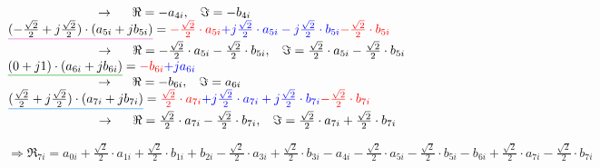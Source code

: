 $\hspace{2.5cm}\rightarrow \hspace{0.5cm} \Re=-a_{4i}, \hspace{0.3cm}\Im=-b_{4i}$\\

$\mathunderline{pink}{(-\frac{\sqrt{2}}{2}+j\frac{\sqrt{2}}{2}) \cdot (a_{5i}+jb_{5i})} = \textcolor{red}{-\frac{\sqrt{2}}{2} \cdot a_{5i}} \textcolor{blue}{+j\frac{\sqrt{2}}{2} \cdot a_{5i} -j\frac{\sqrt{2}}{2} \cdot b_{5i}} \textcolor{red}{-\frac{\sqrt{2}}{2} \cdot b_{5i}}$\\

$\hspace{2.5cm}\rightarrow \hspace{0.5cm} \Re=-\frac{\sqrt{2}}{2} \cdot a_{5i} -\frac{\sqrt{2}}{2} \cdot b_{5i}, \hspace{0.3cm} \Im=\frac{\sqrt{2}}{2} \cdot a_{5i} -\frac{\sqrt{2}}{2} \cdot b_{5i}$\\

$\mathunderline{mygreen}{(0+j1) \cdot (a_{6i}+jb_{6i})} = \textcolor{red}{-b_{6i}} \textcolor{blue}{+ja_{6i}}$\\

$\hspace{2.5cm}\rightarrow \hspace{0.5cm} \Re=-b_{6i}, \hspace{0.3cm}\Im=a_{6i}$\\

$\mathunderline{azure}{(\frac{\sqrt{2}}{2}+j\frac{\sqrt{2}}{2}) \cdot (a_{7i}+jb_{7i})} = \textcolor{red}{\frac{\sqrt{2}}{2} \cdot a_{7i}} \textcolor{blue}{+j\frac{\sqrt{2}}{2} \cdot a_{7i} +j\frac{\sqrt{2}}{2} \cdot b_{7i}} \textcolor{red}{-\frac{\sqrt{2}}{2} \cdot b_{7i}}$\\

$\hspace{2.5cm}\rightarrow \hspace{0.5cm} \Re=\frac{\sqrt{2}}{2} \cdot a_{7i} -\frac{\sqrt{2}}{2} \cdot b_{7i}, \hspace{0.3cm} \Im=\frac{\sqrt{2}}{2} \cdot a_{7i} +\frac{\sqrt{2}}{2} \cdot b_{7i}$\\

\vspace{0.5cm}

\indent$\Rightarrow \Re_{7i} = a_{0i} +\frac{\sqrt{2}}{2} \cdot a_{1i} + \frac{\sqrt{2}}{2} \cdot b_{1i} +b_{2i} -\frac{\sqrt{2}}{2} \cdot a_{3i} +\frac{\sqrt{2}}{2} \cdot b_{3i} -a_{4i} -\frac{\sqrt{2}}{2} \cdot a_{5i} -\frac{\sqrt{2}}{2} \cdot b_{5i} -b_{6i} +\frac{\sqrt{2}}{2} \cdot a_{7i} -\frac{\sqrt{2}}{2} \cdot b_{7i}$\\

